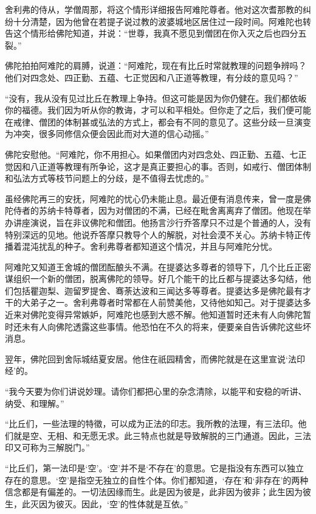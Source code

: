 \documentclass[12pt,twoside,openany]{book}
\begin{document}
舍利弗的侍从，学僧周那，将这个情形详细报告阿难陀尊者。他对这次耆那教的纠纷十分清楚，因为他曾在若提子说过教的波婆城地区居住过一段时间。阿难陀也转告这个情形给佛陀知道，并说：“世尊，我真不愿见到僧团在你入灭之后也四分五裂。”

佛陀拍拍阿难陀的肩膊，说道：“阿难陀，现在有比丘时常就教理的问题争辨吗？他们对四念处、四正勤、五蕴、七正觉因和八正道等教理，有分歧的意见吗？”

“没有，我从没有见过比丘在教理上争持。但这可能是因为你仍健在。我们都依皈你的福德。我们因为听从你的教诲，才可以和平相处。但你走了之后，我们便可能在戒律、僧团的体制甚或弘法的方式上，都会有不同的意见了。这些分歧一旦演变为冲突，很多同修信众便会因此而对大道的信心动摇。”

佛陀安慰他。“阿难陀，你不用担心。如果僧团内对四念处、四正勤、五蕴、七正觉因和八正道等教理有所争论，这才是真正要担心的事。否则，如戒行、僧团体制和弘法方式等枝节问题上的分歧，是不值得去忧虑的。”

虽经佛陀再三的安抚，阿难陀的忧心仍未能止息。最近便有消息传来，曾一度是佛陀侍者的苏纳卡特尊者，因为对僧团的不满，已经在毗舍离离弃了僧团。他现在举办讲座演说，旨在非议佛陀和僧团。他扬言沙行乔答摩只不过是个普通的人，没有特别深远的见地。他说乔答摩只教导个人的解脱，对社会漠不关心。苏纳卡特正传播着混沌扰乱的种子。舍利弗尊者都知道这个情况，并且与阿难陀分忧。

阿难陀又知道王舍城的僧团酝酿头不满。在提婆达多尊者的领导下，几个比丘正密谋组织一个新的僧团，脱离佛陀的领导。好几个能干的比丘都与提婆达多勾结，他们包括瞿迦梨、迦留罗提舍、骞荼达波和三闻达多等尊者。提婆达多是佛陀最有才干的大弟子之一。舍利弗尊者时常都在人前赞美他，又待他如知己。对于提婆达多近来对佛陀变得异常嫉妒，阿难陀也感到大惑不解。他知道暂时还未有人向佛陀暂时还未有人向佛陀透露这些事情。他恐怕在不久的将来，便要亲自告诉佛陀这些坏消息。

翌年，佛陀回到舍际城结夏安居。他住在祇园精舍，而佛陀就是在这里宣说‘法印经’的。

“我今天要为你们讲说妙理。请你们都把心里的杂念清除，以能平和安稳的听讲、纳受、和理解。”

“比丘们，一些法理的特徵，可以成为正法的印志。我所教的法理，有三法印。他们就是空、无相、和无愿无求。此三特点也就是导致解脱的三门通道。因此，三法印又可称为三解脱门。”

“比丘们，第一法印是‘空’。‘空’并不是‘不存在’的意思。它是指没有东西可以独立存在的意思。‘空’是指空无独立的自性个体。你们都知道，‘存在’和‘非存在’的两种信念都是有偏差的。一切法因缘而生。此是因为彼是，此非因为彼非；此生因为彼生，此灭因为彼灭。因此，‘空’的性体就是互依。”
\end{document}
